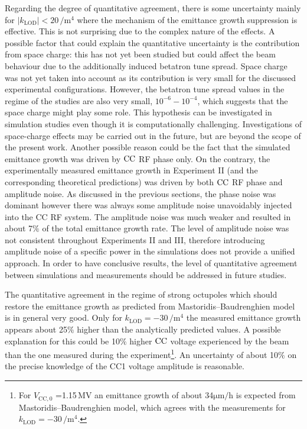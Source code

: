 Regarding the degree of quantitative agreement, there is some uncertainty mainly for $| k_\mathrm{LOD}| < 20$\,$\mathrm{/m^4}$ where the mechanism of the emittance growth suppression is effective. This is not surprising due to the complex nature of the effects. A possible factor that could explain the quantitative uncertainty is the contribution from space charge: this has not yet been studied but could affect the beam behaviour due to the additionally induced betatron tune spread. Space charge was not yet taken into account as its contribution is very small for the discussed experimental configurations. However, the betatron tune spread values in the regime of the studies are also very small, $10^{-6}-10^{-4}$, which suggests that the space charge might play some role. This hypothesis can be investigated in simulation studies even though it is computationally challenging. Investigations of space-charge effects may be carried out in the future, but are beyond the scope of the present work. Another possible reason could be the fact that the simulated emittance growth was driven by ${\mathrm{CC}}$ RF phase only. On the contrary, the experimentally measured emittance growth in Experiment II (and the corresponding theoretical predictions) was driven by both ${\mathrm{CC}}$ RF phase and amplitude noise. As discussed in the previous sections, the phase noise was dominant however there was always some amplitude noise unavoidably injected into the CC RF system. The amplitude noise was much weaker and resulted in about 7$\%$ of the total emittance growth rate. The level of amplitude noise was not consistent throughout Experiments II and III, therefore introducing amplitude noise of a specific power in the simulations does not provide a unified approach. In order to have conclusive results, the level of quantitative agreement between simulations and measurements should be addressed in future studies.

The quantitative agreement in the regime of strong octupoles which should restore the emittance growth as predicted from Mastoridis--Baudrenghien model is in general very good. Only for $k_\mathrm{LOD} =-30$\,$\mathrm{/m^4}$ the measured emittance growth appears about 25$\%$ higher than the analytically predicted values. A possible explanation for this could be 10$\%$ higher ${\mathrm{CC}}$ voltage experienced by the beam than the one measured during the experiment\footnote{For $V_\mathrm{CC,0}$ =1.15\,MV an emittance growth of about 34$\mathrm{\mu m/h}$ is expected from Mastoridis--Baudrenghien model, which agrees with the measurements for $k_\mathrm{LOD} =-30$\,$\mathrm{/m^4}$.}. An uncertainty of about 10$\%$ on the precise knowledge of the CC1 voltage amplitude is reasonable. 


